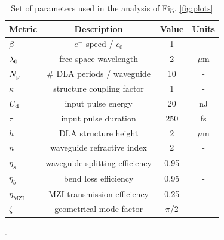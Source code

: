 \begin{table}[!h]
\centering
\begin{tabular}{lccc}
\hline
Metric & Description & Value & Units \\
\hline
$\beta$ & $e^{-}$ speed / $c_0$ & 1 & - \\
$\lambda_\textrm{0}$ & free space wavelength & 2 & $\mu$m \\
$N_\textrm{p}$ & \# DLA periods / waveguide & 10 & - \\
$\kappa$ & structure coupling factor & 1 & - \\
$U_\textrm{d}$ & input pulse energy & 20 & nJ \\
$\tau$ & input pulse duration & 250 & fs \\
$h$ & DLA structure height & 2 & $\mu$m \\
$n$ & waveguide refractive index & 2 & - \\
$\eta_s$ & waveguide splitting efficiency & 0.95 & - \\
$\eta_b$ & bend loss efficiency & 0.95 & - \\
$\eta_\textrm{MZI}$ & MZI transmission efficiency & 0.25 & - \\
$\zeta$ & geometrical mode factor & $\pi$/2 & - \\
\hline
\end{tabular}
\caption{\label{tab:params_MZI} Set of parameters used in the analysis of Fig. \ref{fig:plots}}.
\end{table}

